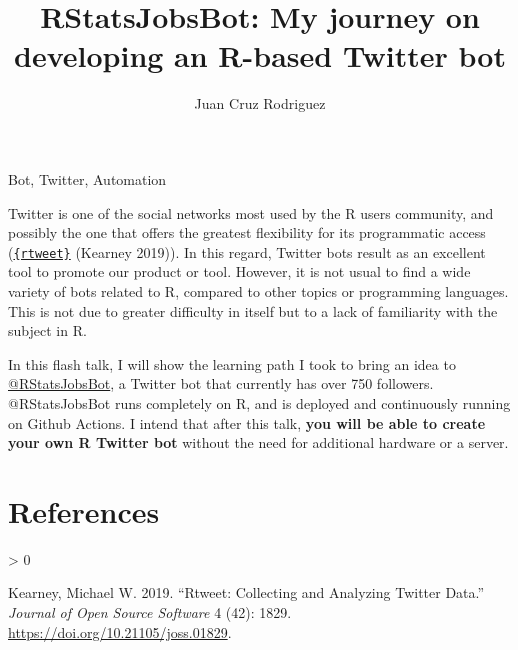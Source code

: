 \documentclass[]{elsarticle} %
\newlength{\cslhangindent}
\newenvironment{CSLReferences}[2] %
 {%
  \setlength{\parindent}{0pt}
  \ifodd #1 \everypar{\setlength{\hangindent}{\cslhangindent}}\ignorespaces\fi
  \ifnum #2 > 0
  \setlength{\parskip}{#2\baselineskip}
  \fi
 }%
 {}
\begin{document}
\begin{frontmatter}

  \title{RStatsJobsBot: My journey on developing an R-based Twitter bot}
    \author[FAMAF - UNC]{Juan Cruz Rodriguez}
      \address[FAMAF - UNC]{FAMAF, Universidad Nacional de Córdoba,
Argentina}
    
  \begin{abstract}
  
  \end{abstract}
   \begin{keyword} Bot, Twitter, Automation\end{keyword}
 \end{frontmatter}

Twitter is one of the social networks most used by the R users
community, and possibly the one that offers the greatest flexibility for
its programmatic access
(\href{https://github.com/ropensci/rtweet}{\texttt{\{rtweet\}}} (Kearney
2019)). In this regard, Twitter bots result as an excellent tool to
promote our product or tool. However, it is not usual to find a wide
variety of bots related to R, compared to other topics or programming
languages. This is not due to greater difficulty in itself but to a lack
of familiarity with the subject in R.

In this flash talk, I will show the learning path I took to bring an
idea to \href{https://twitter.com/RStatsJobsBot}{@RStatsJobsBot}, a
Twitter bot that currently has over 750 followers. @RStatsJobsBot runs
completely on R, and is deployed and continuously running on Github
Actions. I intend that after this talk, \textbf{you will be able to
create your own R Twitter bot} without the need for additional hardware
or a server.

\hypertarget{references}{%
\section*{References}\label{references}}

\hypertarget{refs}{}
\begin{CSLReferences}{1}{0}
\leavevmode\hypertarget{ref-rtweet-package}{}%
Kearney, Michael W. 2019. {``Rtweet: Collecting and Analyzing Twitter
Data.''} \emph{Journal of Open Source Software} 4 (42): 1829.
\url{https://doi.org/10.21105/joss.01829}.

\end{CSLReferences}
\end{document}
